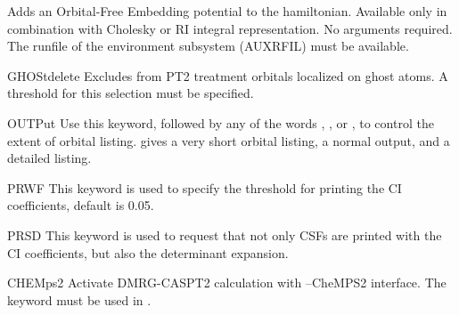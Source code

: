 \begin{keywordlist}
Adds an Orbital-Free Embedding potential to the hamiltonian. Available only in combination with Cholesky or RI integral representation.
No arguments required. The runfile of the environment subsystem (AUXRFIL) must be available.
\item[GHOStdelete]
Excludes from PT2 treatment orbitals localized on ghost atoms.  A threshold for this selection must be specified.
\item[OUTPut]
Use this keyword, followed by any of the words , , or , to
control the extent of orbital listing.
 gives a very short orbital listing,
 a normal output, and  a detailed listing.
\item[PRWF]
This keyword is used to specify the threshold for printing the
CI coefficients, default is 0.05.
\item[PRSD]
This keyword is used to request that not only CSFs are printed with
the CI coefficients, but also the determinant expansion.
\item[CHEMps2]
Activate DMRG-CASPT2 calculation with \molcas--CheMPS2 interface.
The keyword  must be used in .

\end{keywordlist}
